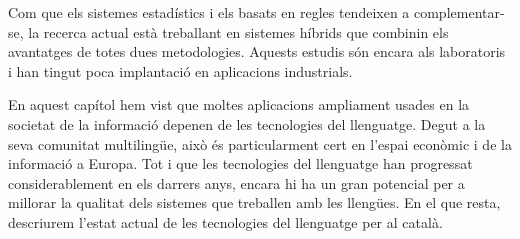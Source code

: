 \begin{multicols}{2}

Com que els sistemes estadístics i els basats en regles tendeixen a complementar-se, la recerca actual està treballant en sistemes híbrids que combinin els avantatges de totes dues metodologies. Aquests estudis són encara als laboratoris i han tingut poca implantació en aplicacions industrials.
	
En aquest capítol hem vist que moltes aplicacions ampliament usades en la societat de la informació depenen de les tecnologies del llenguatge. Degut a la seva comunitat multilingüe, això és particularment cert en l'espai econòmic i de la informació a Europa. Tot i que les tecnologies del llenguatge han progressat considerablement en els darrers anys, encara hi ha un gran potencial per a millorar la qualitat dels sistemes que treballen amb les llengües. En el que resta, descriurem l'estat actual de les tecnologies del llenguatge per al català. 
\end{multicols}

\clearpage



